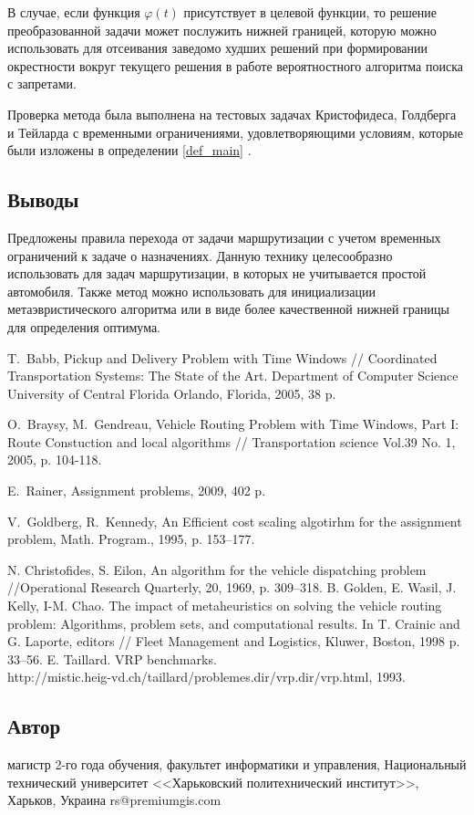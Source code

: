 \documentclass[]{TAACpaper}
\begin{document}
В случае, если функция $\varphi(t)$ присутствует в целевой функции, то решение преобразованной задачи может послужить нижней границей, которую можно использовать для отсеивания заведомо худших решений при формировании окрестности вокруг текущего решения в работе вероятностного алгоритма поиска с запретами.

Проверка метода была выполнена на тестовых задачах Кристофидеса, Голдберга  и Тейларда с временными ограничениями, удовлетворяющими условиям, которые были изложены в определении \ref{def_main} \cite{problems_Christofides,problems_Golden,problems_Taillard}.    

\subsection{Выводы}
Предложены правила перехода от задачи маршрутизации с учетом временных ограничений к задаче о назначениях. Данную технику целесообразно использовать для задач маршрутизации, в которых не учитывается простой автомобиля. Также  метод можно использовать для инициализации метаэвристического алгоритма или в виде более качественной нижней границы для определения оптимума. 


\begin{thebibliography}{99}

 T.~Babb, Pickup and Delivery Problem with Time Windows // Coordinated Transportation Systems: The State of the Art. Department of Computer Science University of Central Florida Orlando, Florida, 2005, 38 p.

 O.~Braysy, M.~Gendreau, Vehicle Routing Problem with Time Windows, Part I: Route Constuction and local algorithms // Transportation science Vol.39 No. 1, 2005, p. 104-118.

 E.~Rainer, Assignment problems, 2009, 402 p. 

 V.~Goldberg, R.~Kennedy, An Efficient cost scaling algotirhm for the assignment problem, Math. Program., 1995, p. 153--177.  

  N. Christofides, S. Eilon, An algorithm for the vehicle dispatching problem //Operational Research Quarterly, 20, 1969, p. 309–318.
  B. Golden, E. Wasil, J. Kelly, I-M. Chao. The impact of metaheuristics on solving the vehicle routing problem: Algorithms, problem sets, and computational results. In T. Crainic and G. Laporte, editors // Fleet Management and Logistics, Kluwer, Boston, 1998 p. 33–56.
  E. Taillard. VRP benchmarks.\\ http://mistic.heig-vd.ch/taillard/problemes.dir/vrp.dir/vrp.html, 1993.
\end{thebibliography}

\subsection{Автор}
\author{Роман Александрович Шафеев}{магистр 2-го года обучения, факультет информатики и управления, Национальный технический университет <<Харьковский политехнический институт>>, Харьков, Украина}
{rs@premiumgis.com}
\end{document}
